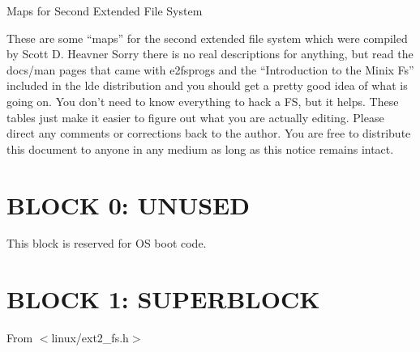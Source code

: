 
% 
%
\parindent 0pt
\parskip 5pt
\topmargin 0pt
\textheight 9in
\textwidth 6.5in
\oddsidemargin 0pt
\evensidemargin 0pt
\pagestyle{myheadings}
	{Maps for Second Extended File System}



These are some ``maps'' for the second extended file system which 
were compiled by 
Scott D. Heavner \linebreak[4]
Sorry there is no real descriptions for
anything, but read the docs/man pages that came with e2fsprogs and 
the ``Introduction to the Minix Fs'' included in the lde distribution
and you should get a pretty good idea of what is going on.  You don't
need to know everything to hack a FS, but it helps.  These tables just
make it easier to figure out what you are actually editing. 
Please direct any comments or
corrections back to the author.  You are free to distribute this
document to anyone in any medium as long as this notice remains intact.

\section*{BLOCK 0: UNUSED}

This block is reserved for OS boot code.

\section*{BLOCK 1: SUPERBLOCK}

From $<$linux/ext2\_fs.h$>$

